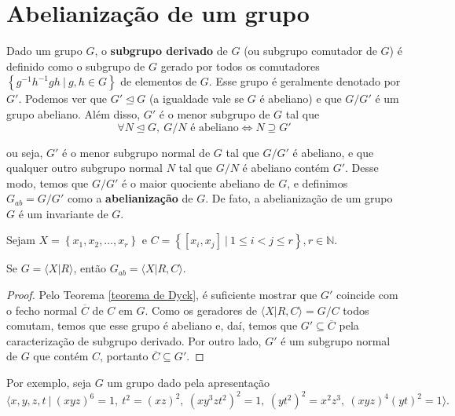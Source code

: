 	\section{Abelianização de um grupo}
	\hspace{12pt} Dado um grupo $G$, o \textbf{subgrupo derivado} de $G$ (ou subgrupo comutador de $G$) é definido como o subgrupo de $G$ gerado por todos os comutadores $\left\{ g^{-1}h^{-1}gh \ | \ g,h\in G \right\}$ de elementos de $G$. Esse grupo é geralmente denotado por $G'$. Podemos ver que $G'\trianglelefteq G$ (a igualdade vale se $G$ é abeliano) e que $G/G'$ é um grupo abeliano. Além disso, $G'$ é o menor subgrupo de $G$ tal que
	\begin{equation*}
	\forall N\trianglelefteq G, \ G/N \text{ é abeliano} \iff N\supseteq
	G'\end{equation*}
	\par\vspace{0.3cm} ou seja, $G'$ é o menor subgrupo normal de $G$ tal que $G/G'$ é abeliano, e que qualquer outro subgrupo normal $N$ tal que $G/N$ é abeliano contém $G'$. Desse modo, temos que $G/G'$ é o maior quociente abeliano de $G$, e definimos $G_{ab} = G/G'$ como a \textbf{abelianização} de $G$. De fato, a abelianização de um grupo $G$ é um invariante de $G$.
	\par\vspace{0.3cm} Sejam  $X = \left\{ x_1, x_2, \dots, x_r \right\}$ e $C = \left\{ [x_i, x_j] \ | \ 1\leq i < j \leq r \right\}, r\in\mathbb{N}$.
	\begin{prop}
		\label{apresentacao abelianizacao}
		Se $G = \langle X|R \rangle$, então $G_{ab} = \langle X|R,C \rangle$.
	\end{prop}
	\begin{proof}
		Pelo Teorema \eqref{teorema de Dyck}, é suficiente mostrar que $G'$ coincide com o fecho normal $\overline{C}$ de $C$ em $G$. Como os geradores de $\langle X|R,C \rangle = G/C$ todos comutam, temos que esse grupo é abeliano e, daí, temos que $G'\subseteq \overline{C}$ pela caracterização de subgrupo derivado. Por outro lado, $G'$ é um subgrupo normal de $G$ que contém $C$, portanto $\overline{C}\subseteq G'$.
	\end{proof}
	\par\vspace{0.3cm} Por exemplo, seja $G$ um grupo dado pela apresentação
	\begin{equation*}
	\langle x,y,z,t \ | \ (xyz)^6 = 1, \ t^2 = (xz)^2, \ (xy^3zt^2)^2 = 1, \ (yt^2)^2 = x^2z^3, \ (xyz)^4(yt)^2 = 1 \rangle.
	\end{equation*}
